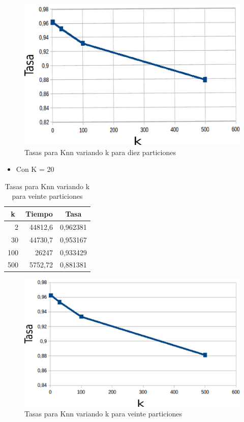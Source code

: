     \begin{figure}[H]
    \centering
    \includegraphics[scale=0.3]{Graficos/knnTasa10.png}
    \caption{Tasas para Knn variando k para diez particiones}
	\label{knnTasa10}
    \end{figure}
\bigskip
\bigskip
\bigskip




\begin{itemize}
\item Con K = 20\\
\end{itemize} 

\begin{table}[H]
\centering
\begin{tabular}{|r|r|r|}
\hline
\multicolumn{1}{|c|}{k} & \multicolumn{1}{c|}{Tiempo} & \multicolumn{1}{c|}{Tasa} \\ \hline
2 & 44812,6 & 0,962381 \\ \hline
30 & 44730,7 & 0,953167 \\ \hline
100 & 26247 & 0,933429 \\ \hline
500 & 5752,72 & 0,881381 \\ \hline
\end{tabular}
 \caption{Tasas para Knn variando k para veinte particiones}
\label{}
\end{table}
\bigskip
\bigskip
\bigskip

    \begin{figure}[H]
    \centering
    \includegraphics[scale=0.3]{Graficos/knnTasa20.png}
    \caption{Tasas para Knn variando k para veinte particiones}
	\label{knnTasa20}
    \end{figure}
\bigskip
\bigskip




